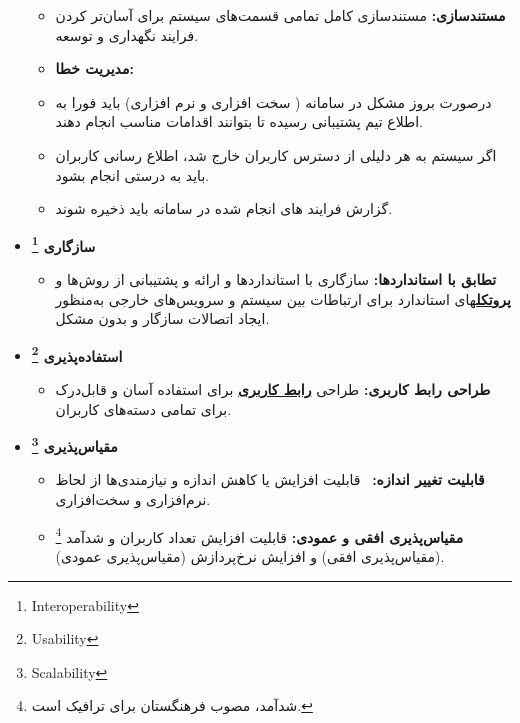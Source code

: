\documentclass[12pt,a4paper,oneside]{article}
\begin{document}
\begin{itemize}
\begin{itemize}
					\item \textbf{مستندسازی:}		
					مستندسازی کامل تمامی قسمت‌های سیستم برای آسان‌تر کردن فرایند نگهداری و توسعه.
					
					\item \textbf{مدیریت خطا:}
					\item درصورت بروز مشکل در سامانه ( سخت افزاری و نرم افزاری) باید فورا به اطلاع تیم پشتیبانی رسیده تا بتوانند اقدامات مناسب انجام دهند.
					\item اگر سیستم به هر دلیلی از دسترس کاربران خارج شد،  اطلاع رسانی کاربران باید به درستی انجام بشود.
					\item گزارش فرایند های انجام شده در سامانه باید ذخیره شوند.
				\end{itemize}
				
				\item \textbf{سازگاری \footnote{Interoperability}}
				\begin{itemize}
					\item \textbf{تطابق با استانداردها:}
					سازگاری با استانداردها و ارائه و پشتیبانی از روش‌ها و 
					\hyperref[ref:protocol]{\textbf{پروتکل}}های استاندارد برای ارتباطات بین سیستم و سرویس‌های خارجی به‌منظور ایجاد اتصالات سازگار و بدون مشکل.		
				\end{itemize}
				
				\item \textbf{استفاده‌پذیری \footnote{Usability}}
				\begin{itemize}
					\item \textbf{طراحی رابط کاربری:}		
					طراحی 
					\hyperref[ref:gui]{\textbf{رابط کاربری}}
					 برای استفاده آسان و قابل‌درک برای تمامی دسته‌های کاربران.
					
					
				\end{itemize}
				
				\item \textbf{مقیاس‌پذیری  \footnote{Scalability}}
				\begin{itemize}
					\item \textbf{قابلیت تغییر اندازه:}
					 قابلیت افزایش یا کاهش اندازه و نیازمندی‌ها از لحاظ نرم‌افزاری و سخت‌افزاری.
					 
					\item \textbf{مقیاس‌پذیری افقی و عمودی:}
					قابلیت افزایش تعداد کاربران و شدآمد
					\footnote{شدآمد، مصوب فرهنگستان برای ترافیک است.}
					 (مقیاس‌پذیری افقی) و افزایش نرخ‌پردازش (مقیاس‌پذیری عمودی).		
				\end{itemize}
				
			\end{itemize}
\end{document}
